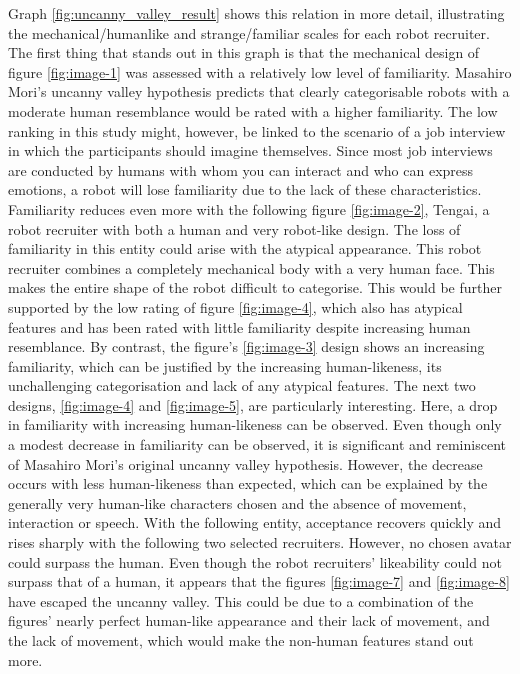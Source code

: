 Graph \ref{fig:uncanny_valley_result} shows this relation in more detail, illustrating the mechanical/humanlike and strange/familiar scales for each robot recruiter. The first thing that stands out in this graph is that the mechanical design of figure \ref{fig:image-1} was assessed with a relatively low level of familiarity. Masahiro Mori's uncanny valley hypothesis predicts that clearly categorisable robots with a moderate human resemblance would be rated with a higher familiarity. The low ranking in this study might, however, be linked to the scenario of a job interview in which the participants should imagine themselves. Since most job interviews are conducted by humans with whom you can interact and who can express emotions, a robot will lose familiarity due to the lack of these characteristics. Familiarity reduces even more with the following figure \ref{fig:image-2}, Tengai, a robot recruiter with both a human and very robot-like design. The loss of familiarity in this entity could arise with the atypical appearance. This robot recruiter combines a completely mechanical body with a very human face. This makes the entire shape of the robot difficult to categorise. This would be further supported by the low rating of figure \ref{fig:image-4}, which also has atypical features and has been rated with little familiarity despite increasing human resemblance. By contrast, the figure's \ref{fig:image-3} design shows an increasing familiarity, which can be justified by the increasing human-likeness, its unchallenging categorisation and lack of any atypical features. The next two designs, \ref{fig:image-4} and \ref{fig:image-5}, are particularly interesting. Here, a drop in familiarity with increasing human-likeness can be observed. Even though only a modest decrease in familiarity can be observed, it is significant and reminiscent of Masahiro Mori's original uncanny valley hypothesis. However, the decrease occurs with less human-likeness than expected, which can be explained by the generally very human-like characters chosen and the absence of movement, interaction or speech. With the following entity, acceptance recovers quickly and rises sharply with the following two selected recruiters. However, no chosen avatar could surpass the human. Even though the robot recruiters' likeability could not surpass that of a human, it appears that the figures \ref{fig:image-7} and \ref{fig:image-8} have escaped the uncanny valley. This could be due to a combination of the figures' nearly perfect human-like appearance and their lack of movement, and the lack of movement, which would make the non-human features stand out more.\\
